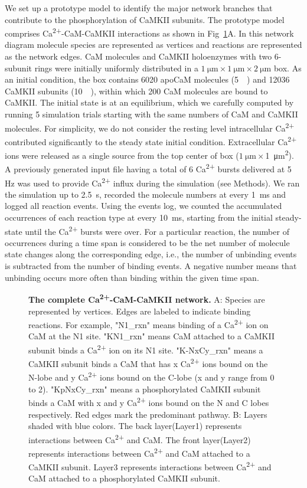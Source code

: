 \documentclass[10pt,letterpaper]{article}
\begin{document}
We set up a prototype model to identify the major network branches that contribute to the phosphorylation of CaMKII subunits. The prototype model comprises Ca\textsuperscript{2+}-CaM-CaMKII interactions as shown in Fig~\ref{fig3}A. In this network diagram molecule species are represented as vertices and reactions are represented as the network edges. CaM molecules and CaMKII holoenzymes with two 6-subunit rings were initially uniformly distributed in a $\SI{1}{\um}\times\SI{1}{\um}\times\SI{2}{\um}$ box. As an initial condition, the box contains 6020 apoCaM molecules (\SI{5}{\micro\Molar}) and 12036 CaMKII subunits (\SI{10}{\micro\Molar}), within which 200 CaM molecules are bound to CaMKII. The initial state is at an equilibrium, which we carefully computed by running 5 simulation trials starting with the same numbers of CaM and CaMKII molecules. For simplicity, we do not consider the resting level intracellular Ca\textsuperscript{2+} contributed significantly to the steady state initial condition. Extracellular Ca\textsuperscript{2+} ions were released as a single source from the top center of box ($\SI{1}{\um}\times$\SI{1}{\square\um}). A previously generated input file having a total of 6 Ca\textsuperscript{2+} bursts delivered at 5 Hz was used to provide Ca\textsuperscript{2+} influx during the simulation (see Methods). We ran the simulation up to \SI{2.5}{\s}, recorded the molecule numbers at every \SI{1}{\ms} and logged all reaction events. Using the events log, we counted the accumulated occurrences of each reaction type at every \SI{10}{\ms}, starting from the initial steady-state until the Ca\textsuperscript{2+} bursts were over. For a particular reaction, the number of occurrences during a time span is considered to be the net number of molecule state changes along the corresponding edge, i.e., the number of unbinding events is subtracted from the number of binding events. A negative number means that unbinding occurs more often than binding within the given time span. 

\begin{figure}[!h]
	\caption{{\bf The complete Ca\textsuperscript{2+}-CaM-CaMKII network.}
	A: Species are represented by vertices. Edges are labeled to indicate binding reactions. For example, "N1\_rxn" means binding of a Ca\textsuperscript{2+} ion on CaM at the N1 site. "KN1\_rxn" means CaM attached to a CaMKII subunit binds a Ca\textsuperscript{2+} ion on its N1 site. "K-NxCy\_rxn" means a CaMKII subunit binds a CaM that has x Ca\textsuperscript{2+} ions bound on the N-lobe and y Ca\textsuperscript{2+} ions bound on the C-lobe (x and y range from 0 to 2). "KpNxCy\_rxn" means a phosphorylated CaMKII subunit binds a CaM with x and y Ca\textsuperscript{2+} ions bound on the N and C lobes respectively. Red edges mark the predominant pathway. B: Layers shaded with blue colors. The back layer(Layer1) represents interactions between Ca\textsuperscript{2+} and CaM. The front layer(Layer2) represents interactions between Ca\textsuperscript{2+} and CaM attached to a CaMKII subunit. Layer3 represents interactions between Ca\textsuperscript{2+} and CaM attached to a phosphorylated CaMKII subunit.
	}
\label{fig3}
\end{figure}
\end{document}
